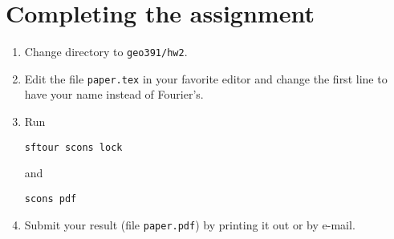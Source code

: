 \section{Completing the assignment}

\begin{enumerate}
\item Change directory to \verb#geo391/hw2#.
\item Edit the file \texttt{paper.tex} in your favorite editor and change the
first line to have your name instead of Fourier's.
\item Run
\begin{verbatim}
sftour scons lock
\end{verbatim}
and
\begin{verbatim}
scons pdf
\end{verbatim}
\item Submit your result (file \texttt{paper.pdf}) by printing it out
  or by e-mail.
\end{enumerate}
